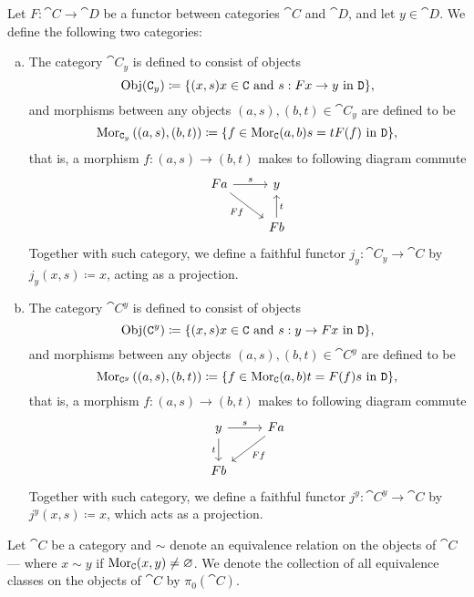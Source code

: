 \begin{definition}
\label{def:functor-induced-cats}
Let \(F: \cat C \to \cat D\) be a functor between categories \(\cat C\) and
\(\cat D\), and let \(y \in \cat D\). We define the following two categories:
\begin{enumerate}[(a)]\setlength\itemsep{0em}
\item The category \(\cat C_y\) is defined to consist of objects
  \[
    \operatorname{Obj}(\texttt C_y) \coloneq
    \{(x, s) \relax x \in \texttt C \text{ and } s: F x \to y \text{ in } \texttt D\},
  \]
  and morphisms between any objects \((a, s), (b, t) \in \cat C_{y}\) are
  defined to be
  \[
    \operatorname{Mor}_{\texttt C_y}\left( (a, s), (b, t) \right) \coloneq
    \{f \in \operatorname{Mor}_{\texttt C}(a, b) \relax s = t F(f) \text{ in } \texttt D\},
  \]
  that is, a morphism \(f: (a, s) \to (b, t)\) makes to following diagram
  commute
  \[
    \begin{tikzcd}
      F a \ar[r, "s"] \ar[dr, swap, "Ff"] &y \\
      &F b \ar[u, swap, "t"]
    \end{tikzcd}
  \]
  Together with such category, we define a faithful functor \(j_y: \cat C_y \to
  \cat C\) by \(j_y(x, s) \coloneq x\), acting as a projection.
\item The category \(\cat C^y\) is defined to consist of objects
  \[
    \operatorname{Obj}(\texttt C^y) \coloneq
    \{(x, s) \relax x \in \texttt C \text{ and } s: y \to F x \text{ in } \texttt D\},
  \]
  and morphisms between any objects \((a, s), (b, t) \in \cat C^{y}\) are
  defined to be
  \[
    \operatorname{Mor}_{\texttt C^y}\left( (a, s), (b, t) \right) \coloneq
    \{f \in \operatorname{Mor}_{\texttt C}(a, b) \relax t = F(f) s \text{ in } \texttt D\},
  \]
  that is, a morphism \(f: (a, s) \to (b, t)\) makes to following diagram
  commute
  \[
    \begin{tikzcd}
      y \ar[r, "s"] \ar[d, swap, "t"] &Fa \ar[dl, "F f"] \\
      F b &
    \end{tikzcd}
  \]
  Together with such category, we define a faithful functor \(j^y: \cat C^y \to
  \cat C\) by \(j^y(x, s) \coloneq x\), which acts as a projection.
\end{enumerate}
\end{definition}

\begin{definition}
\label{def:equivalence-class-category}
Let \(\cat C\) be a category and \(\sim\) denote an equivalence relation on the
objects of \(\cat C\) --- where \(x \sim y\) if \(\operatorname{Mor}_{\texttt C}(x, y) \neq
\varnothing\). We denote the collection of all equivalence classes on the objects
of \(\cat C\) by \(\pi_0(\cat C)\).
\end{definition}

